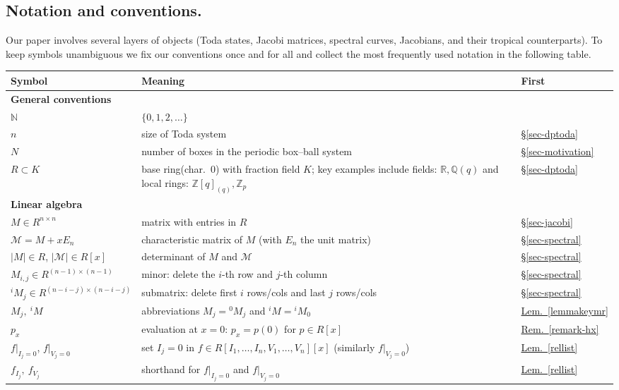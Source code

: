 \documentclass[11pt, a4paper]{amsart}
\theoremstyle{plain}
\numberwithin{equation}{section}
\begin{document}
\subsection{Notation and conventions.}
Our paper involves several layers of objects (Toda states, Jacobi matrices, spectral curves, Jacobians, and their tropical counterparts).
To keep symbols unambiguous we fix our conventions once and for all and collect the most frequently used notation in the following table.
\begin{table}[H]
\centering
\scriptsize
\setlength{\tabcolsep}{3.5pt}
\renewcommand{\arraystretch}{1.02}
\begin{tabular}{p{} p{} p{}}
\hline
Symbol & Meaning & First \\
\hline

\multicolumn{3}{l}{\textbf{General conventions}}\\
$\mathbb{N}$ & $\{0,1,2,\dots\}$ &  \\
$n$ & size of Toda system & \hyperref[sec-dptoda]{\S\ref*{sec-dptoda}} \\
$N$ & number of boxes in the periodic box--ball system & \hyperref[sec-motivation]{\S\ref*{sec-motivation}} \\
$R\subset K$ & base ring\footnotemark (char.~$0$) with fraction field $K$; key examples include fields: $\mathbb{R},\mathbb{Q}(q)$ and local rings: $\mathbb{Z}[q]_{(q)},\mathbb{Z}_p$ & \hyperref[sec-dptoda]{\S\ref*{sec-dptoda}} \\
\hline

\multicolumn{3}{l}{\textbf{Linear algebra}}\\
$M\in R^{n\times n}$ & matrix with entries in $R$ & \hyperref[sec-jacobi]{\S\ref*{sec-jacobi}} \\
$\mathcal M = M + xE_n$ & characteristic matrix of $M$ (with $E_n$ the unit matrix) & \hyperref[sec-spectral]{\S\ref*{sec-spectral}} \\
$\vert M \vert \in R$, $\vert \mathcal M \vert \in R[x]$ & determinant of $M$ and $\mathcal M$ & \hyperref[sec-spectral]{\S\ref*{sec-spectral}} \\
$M_{i,j} \in R^{(n-1)\times (n-1)}$& minor: delete the $i$-th row and $j$-th column & \hyperref[sec-spectral]{\S\ref*{sec-spectral}} \\
${}^i M _j \in R^{(n-i-j)\times(n-i-j)}$  & submatrix: delete first $i$ rows/cols and last $j$ rows/cols & \hyperref[sec-spectral]{\S\ref*{sec-spectral}} \\
$M_{j},\ {}^{i}\!M$ & abbreviations $M_j={}^{0}\!M_j$ and ${}^{i}\!M={}^{i}\!M_{0}$ & \hyperref[lemmakeymr]{Lem.~\ref*{lemmakeymr}} \\
$p_x$ & evaluation at $x=0$: $p_x=p(0)$ for $p\in R[x]$ & \hyperref[remark-hx]{Rem.~\ref*{remark-hx}} \\
$f|_{I_j=0}$, $f|_{V_j=0}$ & set $I_j=0$ in $f\in R[I_1,\dots,I_n,V_1,\dots,V_n][x]$ (similarly $f|_{V_j=0}$) & \hyperref[rellist]{Lem.~\ref*{rellist}} \\
$f_{I_j},\ f_{V_j}$ & shorthand for $f|_{I_j=0}$ and $f|_{V_j=0}$ & \hyperref[rellist]{Lem.~\ref*{rellist}} \\
\hline


\end{tabular}
\end{table}
\end{document}
